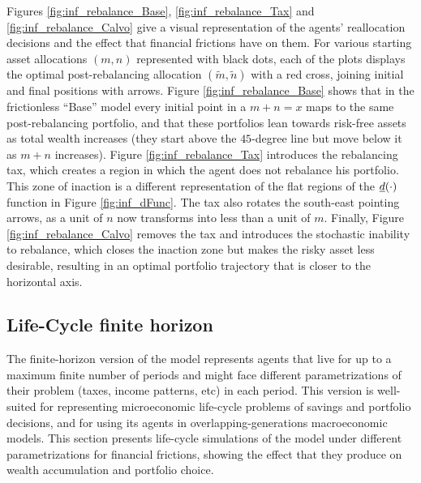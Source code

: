 \documentclass[./RiskyContrib.tex]{subfiles}
\begin{document}




Figures \ref{fig:inf_rebalance_Base}, \ref{fig:inf_rebalance_Tax} and
\ref{fig:inf_rebalance_Calvo} give a visual representation of the agents'
reallocation decisions and the effect that financial frictions have on them.
For various starting asset allocations $(m,n)$ represented with black dots,
each of the plots displays the optimal post-rebalancing allocation
$(\tilde{m},\tilde{n})$  with a red cross, joining initial and final positions
with arrows. Figure \ref{fig:inf_rebalance_Base} shows that in the frictionless
``Base'' model every initial point in a $m+n=x$ maps to the same post-rebalancing
portfolio, and that these portfolios lean towards risk-free assets as total wealth
increases (they start above the $45$-degree line but move below it as $m+n$ increases).
Figure \ref{fig:inf_rebalance_Tax} introduces the rebalancing tax, which creates
a region in which the agent does not rebalance his portfolio. This zone of
inaction is a different representation of the flat regions of the $\underline{d}(\cdot)$
function in Figure \ref{fig:inf_dFunc}. The tax also rotates the south-east pointing
arrows, as a unit of $n$ now transforms into less than a unit of $m$. Finally,
Figure \ref{fig:inf_rebalance_Calvo} removes the tax and introduces the stochastic
inability to rebalance, which closes the inaction zone but makes the risky asset
less desirable, resulting in an optimal portfolio trajectory that is closer to
the horizontal axis.


\subsection{Life-Cycle finite horizon}

The finite-horizon version of the model represents agents that live for up to
a maximum finite number of periods and might face different parametrizations
of their problem (taxes, income patterns, etc) in each period. This version is
well-suited for representing microeconomic life-cycle problems of savings and
portfolio decisions, and for using its agents in overlapping-generations macroeconomic
models. This section presents life-cycle simulations of the model under different
parametrizations for financial frictions, showing the effect that they produce
on wealth accumulation and portfolio choice.
\end{document}
